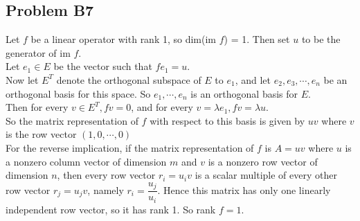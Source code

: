 \documentclass{article}
\begin{document}
\subsection{Problem B7}
Let $f$ be a linear operator with rank 1, so dim(im $f$) = 1. Then set $u$ to be
the generator of im $f$. 
\\Let $e_1 \in E$ be the vector such that $fe_1 = u$. 
\\Now let $E^T$ denote the orthogonal subspace of $E$ to $e_1$, and let $e_2,e_3,\cdots,e_n$ be an orthogonal basis for this space. So $e_1,\cdots,e_n$ is an orthogonal basis for $E$.
\\Then for every $v \in E^T,fv=0$, and for every $v=\lambda e_1,fv=\lambda u$. 
\\So the matrix representation of $f$ with respect to this basis is given by $uv$ where $v$ is the row vector $(1,0,\cdots ,0)$
\\For the reverse implication, if the matrix representation of $f$ is $A=uv$ where $u$ is a nonzero column vector of dimension $m$ and $v$ is a nonzero row vector of dimension $n$, then every row vector $r_i = u_i v$ is a scalar multiple of every other row vector $r_j = u_j v$, namely $r_i = \dfrac{u_j}{u_i}$. Hence this matrix has only one linearly independent row vector, so it has rank 1. So rank $f = 1$. 
\end{document}
